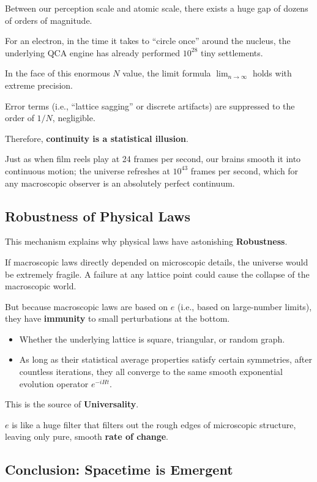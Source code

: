 Between our perception scale and atomic scale, there exists a huge gap of dozens of orders of magnitude.

For an electron, in the time it takes to ``circle once'' around the nucleus, the underlying QCA engine has already performed $10^{28}$ tiny settlements.

In the face of this enormous $N$ value, the limit formula $\lim_{n \to \infty}$ holds with extreme precision.

Error terms (i.e., ``lattice sagging'' or discrete artifacts) are suppressed to the order of $1/N$, negligible.

Therefore, \textbf{continuity is a statistical illusion}.

Just as when film reels play at 24 frames per second, our brains smooth it into continuous motion; the universe refreshes at $10^{43}$ frames per second, which for any macroscopic observer is an absolutely perfect continuum.

\subsection{Robustness of Physical Laws}

This mechanism explains why physical laws have astonishing \textbf{Robustness}.

If macroscopic laws directly depended on microscopic details, the universe would be extremely fragile. A failure at any lattice point could cause the collapse of the macroscopic world.

But because macroscopic laws are based on $e$ (i.e., based on large-number limits), they have \textbf{immunity} to small perturbations at the bottom.

\begin{itemize}
\item Whether the underlying lattice is square, triangular, or random graph.

\item As long as their statistical average properties satisfy certain symmetries, after countless iterations, they all converge to the same smooth exponential evolution operator $e^{-iHt}$.
\end{itemize}

This is the source of \textbf{Universality}.

$e$ is like a huge filter that filters out the rough edges of microscopic structure, leaving only pure, smooth \textbf{rate of change}.

\subsection{Conclusion: Spacetime is Emergent}

